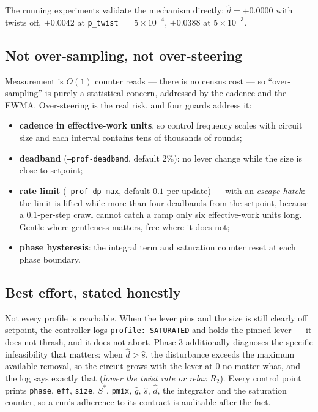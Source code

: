 \documentclass[11pt]{article}
\newcommand{\code}[1]{\texttt{#1}}
\begin{document}
The running experiments validate the mechanism directly:
$\hat d = +0.0000$ with twists off, $+0.0042$ at
\code{p\_twist}~$=5\times10^{-4}$, $+0.0388$ at $5\times10^{-3}$.

\subsection{Not over-sampling, not over-steering}

Measurement is $O(1)$ counter reads --- there is no census cost --- so
``over-sampling'' is purely a statistical concern, addressed by the cadence
and the EWMA. Over-steering is the real risk, and four guards address it:

\begin{itemize}
\item \textbf{cadence in effective-work units}, so control frequency scales
with circuit size and each interval contains tens of thousands of rounds;
\item \textbf{deadband} (\code{--prof-deadband}, default $2\%$): no lever
change while the size is close to setpoint;
\item \textbf{rate limit} (\code{--prof-dp-max}, default $0.1$ per update)
--- with an \emph{escape hatch}: the limit is lifted while more than four
deadbands from the setpoint, because a $0.1$-per-step crawl cannot catch a
ramp only six effective-work units long. Gentle where gentleness matters,
free where it does not;
\item \textbf{phase hysteresis}: the integral term and saturation counter
reset at each phase boundary.
\end{itemize}

\subsection{Best effort, stated honestly}

Not every profile is reachable. When the lever pins and the size is still
clearly off setpoint, the controller logs \code{profile: SATURATED} and
holds the pinned lever --- it does not thrash, and it does not abort. Phase
3 additionally diagnoses the specific infeasibility that matters:
when $\hat d > \hat s$, the disturbance exceeds the maximum available
removal, so the circuit grows with the lever at $0$ no matter what, and the
log says exactly that (\emph{lower the twist rate or relax $R_2$}). Every
control point prints \code{phase}, \code{eff}, \code{size}, $S^*$,
\code{pmix}, $\hat g$, $\hat s$, $\hat d$, the integrator and the
saturation counter, so a run's adherence to its contract is auditable after
the fact.
\end{document}
